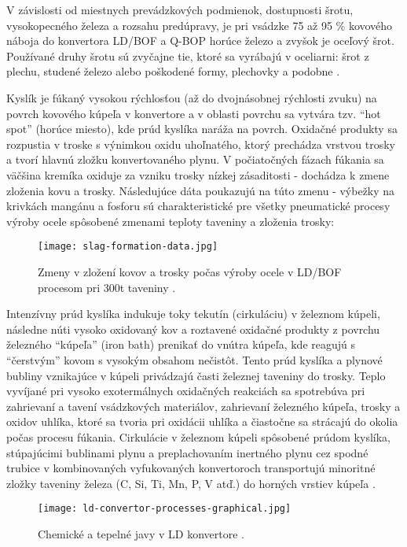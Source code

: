 V závislosti od miestnych prevádzkových podmienok, dostupnosti šrotu, vysokopecného železa a rozsahu predúpravy, je pri vsádzke 75 až 95 \% kovového náboja do konvertora LD/BOF a Q-BOP horúce železo a zvyšok je oceľový šrot. Používané druhy šrotu sú zvyčajne tie, ktoré sa vyrábajú v oceliarni: šrot z plechu, studené železo alebo poškodené formy, plechovky a podobne \cite{Turkdogan1996}.

Kyslík je fúkaný vysokou rýchlosťou (až do dvojnásobnej rýchlosti zvuku) na povrch kovového kúpeľa v konvertore a v oblasti povrchu sa vytvára tzv. “hot spot” (horúce miesto), kde prúd kyslíka naráža na povrch. Oxidačné produkty sa rozpustia v troske s výnimkou oxidu uhoľnatého, ktorý prechádza vrstvou trosky a tvorí hlavnú zložku konvertovaného plynu. V počiatočných fázach fúkania sa väčšina kremíka oxiduje za vzniku trosky nízkej zásaditosti - dochádza k zmene zloženia kovu a trosky. Následujúce dáta poukazujú na túto zmenu - výbežky na krivkách mangánu a fosforu sú charakteristické pre všetky pneumatické procesy výroby ocele spôsobené zmenami teploty taveniny a zloženia trosky:

\begin{figure}[h!]
	\centering
	\texttt{[image: slag-formation-data.jpg]}
	\caption{Zmeny v zložení kovov a trosky počas výroby ocele v LD/BOF procesom pri 300t taveniny \citep{Turkdogan1996}.}
	\label{o:20}
\end{figure}

Intenzívny prúd kyslíka indukuje toky tekutín (cirkuláciu) v železnom kúpeli, následne núti vysoko oxidovaný kov a  roztavené oxidačné produkty z povrchu železného “kúpeľa” (iron bath) prenikať do vnútra kúpeľa, kde reagujú s “čerstvým” kovom s vysokým obsahom nečistôt. Tento prúd kyslíka a plynové bubliny vznikajúce v kúpeli privádzajú časti železnej taveniny do trosky. Teplo vyvíjané pri vysoko exotermálnych oxidačných reakciách sa spotrebúva pri zahrievaní a tavení vsádzkových materiálov, zahrievaní železného kúpeľa, trosky a oxidov uhlíka, ktoré sa tvoria pri oxidácii uhlíka a čiastočne sa strácajú do okolia počas procesu fúkania. Cirkulácie v železnom kúpeli spôsobené prúdom kyslíka, stúpajúcimi bublinami plynu a preplachovaním inertného plynu cez spodné trubice v kombinovaných vyfukovaných konvertoroch transportujú minoritné zložky taveniny železa (C, Si, Ti, Mn, P, V atď.) do horných vrstiev kúpeľa \cite{Jalkanen2006}. 

\begin{figure}[h!]
	\centering
	\texttt{[image: ld-convertor-processes-graphical.jpg]}
	\caption{Chemické a tepelné javy v LD konvertore \citep{Jalkanen2006}.}
	\label{o:25}
\end{figure}


